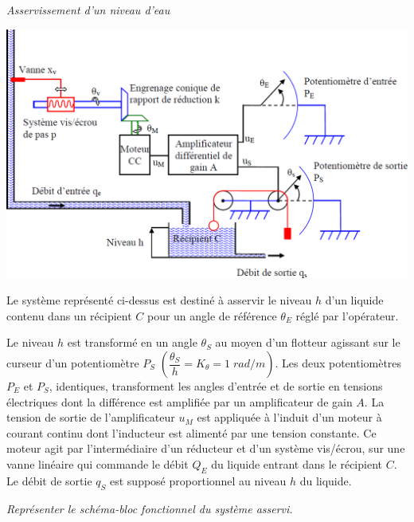 \documentclass[10pt,fleqn]{article} %
\begin{document}
\begin{exemple}
\textit{Asservissement d'un niveau d'eau}
\begin{center}
    \includegraphics[width=\textwidth]{images/Exo3_01}
\end{center}

Le système représenté ci-dessus est destiné à asservir le niveau $h$ d'un liquide contenu dans un récipient $C$ pour un angle de référence $\theta_E$ réglé par l'opérateur.

Le niveau $h$ est transformé en un angle $\theta_S$ au moyen d'un flotteur agissant sur le curseur d'un potentiomètre $P_S$ $\left(\dfrac{\theta_S}{h}=K_\theta=1\;rad/m\right)$. Les deux potentiomètres $P_E$ et $P_S$, identiques, transforment les angles d'entrée et de sortie en tensions électriques dont la différence est amplifiée par un amplificateur de gain $A$. La tension de sortie de l'amplificateur $u_M$ est appliquée à l'induit d'un moteur à courant continu dont l'inducteur est alimenté par une tension constante. Ce moteur agit par l'intermédiaire d'un réducteur et d'un système vis/écrou, sur une vanne linéaire qui commande le débit $Q_E$ du liquide entrant dans le récipient $C$. Le débit de sortie $q_S$ est supposé proportionnel au niveau $h$ du liquide. 

\textit{Représenter le schéma-bloc fonctionnel du système asservi.}

\end{exemple}
\end{document}

